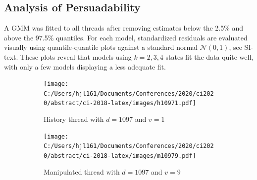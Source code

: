 \documentclass[9pt,twocolumn,twoside,lineno]{article}
\begin{document}
\subsection*{Analysis of Persuadability} 
A GMM was fitted to all threads after removing estimates below the 2.5\% and above the 97.5\% quantiles. For each model, standardized residuals are evaluated visually using quantile-quantile plots against a standard normal $\mathcal{N}(0,1)$, see SI-text. These plots reveal that models using $k=2,3,4$ states fit the data quite well, with only a few models displaying a less adequate fit.

\begin{figure}[!h]
	\centering
	\begin{subfigure}{.44\linewidth}
		\centering
		\texttt{[image: C:/Users/hjl161/Documents/Conferences/2020/ci2020/abstract/ci-2018-latex/images/h10971.pdf]}
		\caption{\footnotesize History thread with $d=1097$ and $v=1$}
		\label{fig: h=history d=1097, v=1}
	\end{subfigure}
	\begin{subfigure}{.44\linewidth}
		\centering
		\texttt{[image: C:/Users/hjl161/Documents/Conferences/2020/ci2020/abstract/ci-2018-latex/images/m10979.pdf]}
		\caption{\footnotesize Manipulated thread with $d=1097$ and $v=9$}
		\label{fig: h=max d=1097, v=9}
	\end{subfigure}
	\begin{subfigure}{.1\linewidth}
		\centering

\end{subfigure}
\end{figure}
\end{document}
